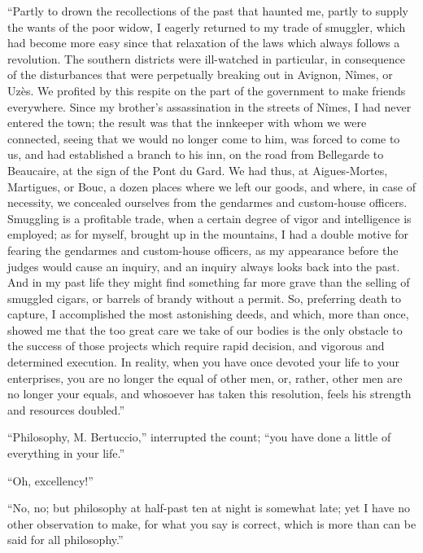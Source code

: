 “Partly to drown the recollections of the past that haunted me, partly
to supply the wants of the poor widow, I eagerly returned to my trade
of smuggler, which had become more easy since that relaxation of the
laws which always follows a revolution. The southern districts were
ill-watched in particular, in consequence of the disturbances that were
perpetually breaking out in Avignon, Nîmes, or Uzès. We profited by
this respite on the part of the government to make friends everywhere.
Since my brother’s assassination in the streets of Nîmes, I had never
entered the town; the result was that the innkeeper with whom we were
connected, seeing that we would no longer come to him, was forced to
come to us, and had established a branch to his inn, on the road from
Bellegarde to Beaucaire, at the sign of the Pont du Gard. We had thus,
at Aigues-Mortes, Martigues, or Bouc, a dozen places where we left our
goods, and where, in case of necessity, we concealed ourselves from the
gendarmes and custom-house officers. Smuggling is a profitable trade,
when a certain degree of vigor and intelligence is employed; as for
myself, brought up in the mountains, I had a double motive for fearing
the gendarmes and custom-house officers, as my appearance before the
judges would cause an inquiry, and an inquiry always looks back into
the past. And in my past life they might find something far more grave
than the selling of smuggled cigars, or barrels of brandy without a
permit. So, preferring death to capture, I accomplished the most
astonishing deeds, and which, more than once, showed me that the too
great care we take of our bodies is the only obstacle to the success of
those projects which require rapid decision, and vigorous and
determined execution. In reality, when you have once devoted your life
to your enterprises, you are no longer the equal of other men, or,
rather, other men are no longer your equals, and whosoever has taken
this resolution, feels his strength and resources doubled.”

“Philosophy, M. Bertuccio,” interrupted the count; “you have done a
little of everything in your life.”

“Oh, excellency!”

“No, no; but philosophy at half-past ten at night is somewhat late; yet
I have no other observation to make, for what you say is correct, which
is more than can be said for all philosophy.”

